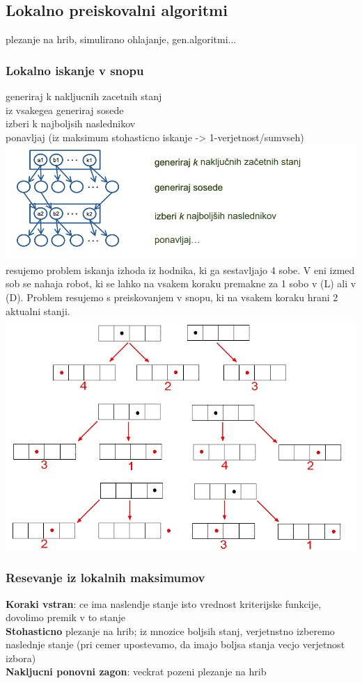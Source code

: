 \subsection{Lokalno preiskovalni algoritmi}
plezanje na hrib, simulirano ohlajanje, gen.algoritmi...
\subsubsection{Lokalno iskanje v snopu}
generiraj k nakljucnih zacetnih stanj\\
iz vsakegea generiraj sosede\\
izberi k najboljsih naslednikov\\
ponavljaj (iz maksimum stohasticno iskanje -> 1-verjetnost/sumvseh)
\includegraphics[width=\columnwidth]{images/lokalno_iskanje_v_snopu.png}
 resujemo problem iskanja izhoda iz hodnika, ki ga sestavljajo 4 sobe.
V eni izmed sob se nahaja robot, ki se lahko na vsakem koraku premakne za 1 sobo v (L) ali
v (D). Problem resujemo s preiskovanjem v snopu, ki na vsakem koraku hrani 2 aktualni stanji.\\
\includegraphics[width=\columnwidth]{images/iskanje_v_snopu.png}
\subsubsection{Resevanje iz lokalnih maksimumov}
\textbf{Koraki vstran}: ce ima naslendje stanje isto vrednost kriterijske funkcije, dovolimo premik
v to stanje\\
\textbf{Stohasticno} plezanje na hrib; iz mnozice boljsih stanj, verjetnstno izberemo naslednje stanje (pri 
cemer upostevamo, da imajo boljsa stanja vecjo verjetnost izbora)\\
\textbf{Nakljucni ponovni zagon}: veckrat pozeni plezanje na hrib 